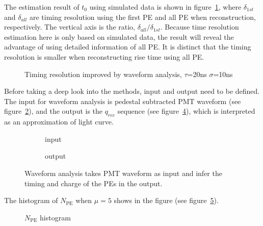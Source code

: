 The estimation result of $t_{0}$ using simulated data is shown in figure~\ref{fig:reso-diff}, where $\delta_{1st}$ and $\delta_{all}$ are timing resolution using the first PE and all PE when reconstruction, respectively. The vertical axis is the ratio, $\delta_{all}/\delta_{1st}$. Because time resolution estimation here is only based on simulated data, the result will reveal the advantage of using detailed information of all PE. It is distinct that the timing resolution is smaller when reconstructing rise time using all PE. 

\begin{figure}[H]
    \centering
    \scalebox{0.5}{}
    \caption{\label{fig:reso-diff} Timing resolution improved by waveform analysis, $\tau$=20ns $\sigma$=10ns}
\end{figure}

Before taking a deep look into the methods, input and output need to be defined. The input for waveform analysis is pedestal subtracted PMT waveform (see figure~\ref{fig:input}), and the output is the $q_{rec}$ sequence (see figure~\ref{fig:output}), which is interpreted as an approximation of light curve. 

\begin{figure}[H]
  \begin{subfigure}{.5\textwidth}
    \centering
    \resizebox{\textwidth}{!}{}
    \caption{\label{fig:input} input}
  \end{subfigure}
  \begin{subfigure}{.5\textwidth}
    \centering
    \resizebox{\textwidth}{!}{}
    \caption{\label{fig:output} output}
  \end{subfigure}
  \caption{Waveform analysis takes PMT waveform as input and infer the timing and charge of the PEs in the output.}
\end{figure}

The histogram of $N_\mathrm{PE}$ when $\mu=5$ shows in the figure (see figure~\ref{fig:penum}). 

\begin{figure}[H]
    \centering
    \scalebox{0.4}{}
    \caption{\label{fig:penum} $N_\mathrm{PE}$ histogram}
\end{figure}

